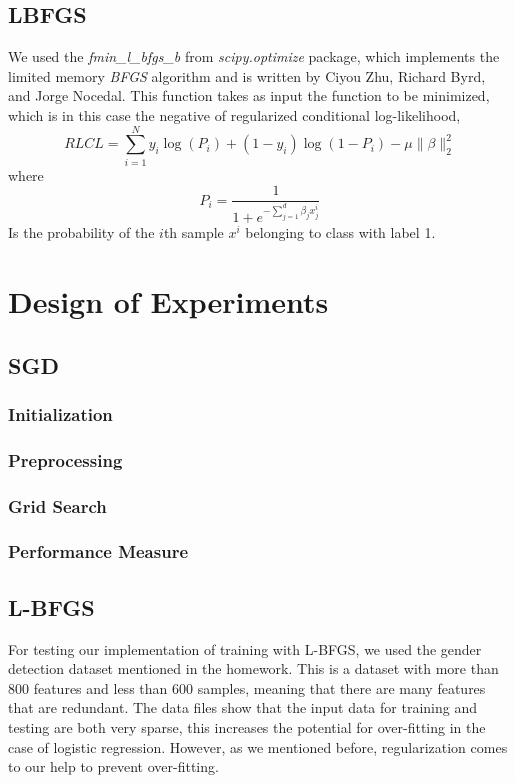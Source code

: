 \documentclass[twoside,12pt]{article}
\begin{document}
\subsection{LBFGS}
We used the {\it fmin\_l\_bfgs\_b} from { \it scipy.optimize} package, which implements the limited memory {\it BFGS} algorithm and is written by Ciyou Zhu, Richard Byrd, and Jorge Nocedal. This function takes as input the function to be minimized, which is in this case the negative of regularized conditional log-likelihood,
\begin{equation}
RLCL = \sum_{i=1}^N y_i \log(P_i) + (1-y_i)\log(1 - P_i) - \mu \|\beta\|_2^2
\end{equation}
where 
\begin{equation}
P_i = \frac{1}{1+e^{-\sum_{j=1}^d \beta_j x^i_j}}
\end{equation}
Is the probability of the $i$th sample $x^i$ belonging to class with label 1. 
\section{Design of Experiments}
\subsection{SGD}
\subsubsection{Initialization}
\subsubsection{Preprocessing}
\subsubsection{Grid Search}
\subsubsection{Performance Measure}

\subsection{L-BFGS}
For testing our implementation of training with L-BFGS, we used the gender detection dataset mentioned in the homework. This is a dataset with more than 800 features and less than 600 samples, meaning that there are many features that are redundant. The data files show that the input data for training and testing are both very sparse, this increases the potential for over-fitting in the case of logistic regression. However, as we mentioned before, regularization comes to our help to prevent over-fitting.
\end{document}
